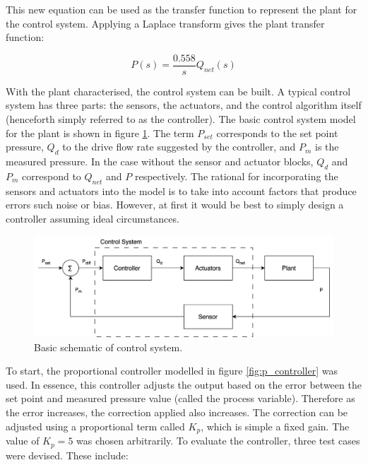 This new equation can be used as the transfer function to represent the plant for the control system. Applying a Laplace transform gives the plant transfer function:

\begin{equation}
    P(s) = \frac{0.558}{s} Q_{net}(s)
    \label{eq:transfer_function}
\end{equation}

With the plant characterised, the control system can be built. A typical control system has three parts: the sensors, the actuators, and the control algorithm itself (henceforth simply referred to as the controller). The basic control system model for the plant is shown in figure \ref{fig:control_system}. The term $P_{set}$ corresponds to the set point pressure, $Q_d$ to the drive flow rate suggested by the controller, and $P_m$ is the measured pressure. In the case without the sensor and actuator blocks, $Q_d$ and $P_m$ correspond to $Q_{net}$ and $P$ respectively.  The rational for incorporating the sensors and actuators into the model is to take into account factors that produce errors such noise or bias. However, at first it would be best to simply design a controller assuming ideal circumstances. 

\begin{figure}[h!]
	\centering
	\includegraphics[width=\linewidth]{chapter_5/figures/control_system.png}
	\caption{Basic schematic of control system.}
	\label{fig:control_system}
\end{figure}
 
To start, the proportional controller modelled in figure \ref{fig:p_controller} was used. In essence, this controller adjusts the output based on the error between the set point and measured pressure value (called the process variable). Therefore as the error increases, the correction applied also increases. The correction can be adjusted using a proportional term called $K_p$, which is simple a fixed gain. The value of $K_p = 5$ was chosen arbitrarily. To evaluate the controller, three test cases were devised. These include:

